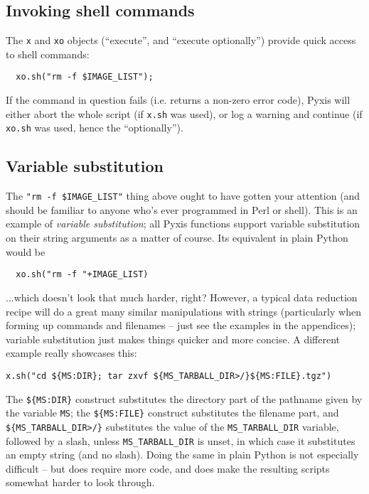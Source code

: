 \documentclass[a4paper,10pt]{article}
\begin{document}
\subsection{Invoking shell commands}

The {\tt x} and {\tt xo} objects (``execute'', and ``execute optionally'') provide quick access to shell 
commands:

\begin{verbatim}
  xo.sh("rm -f $IMAGE_LIST");
\end{verbatim}

If the command in question fails (i.e. returns a non-zero error code), Pyxis will either abort the whole script 
(if {\tt x.sh} was used), or log a warning and continue (if {\tt xo.sh} was used, hence the ``optionally'').

\subsection{Variable substitution}

The {\tt "rm -f \$IMAGE\_LIST"} thing above ought to have gotten your attention (and should be familiar to anyone who's 
ever programmed in Perl or shell). This is an example of {\em variable substitution}; all Pyxis functions support variable
substitution on their string arguments as a matter of course. Its equivalent in plain Python would be

\begin{verbatim}
  xo.sh("rm -f "+IMAGE_LIST)
\end{verbatim}

...which doesn't look that much harder, right? However, a typical data reduction recipe will do a great many similar
manipulations with strings (particularly when forming up commands and filenames -- just see the examples in the appendices);
variable substitution just makes things quicker and more concise. A different example really showcases this:

\begin{verbatim}
x.sh("cd ${MS:DIR}; tar zxvf ${MS_TARBALL_DIR>/}${MS:FILE}.tgz")
\end{verbatim}

The {\tt \$\{MS:DIR\}} construct substitutes the directory part of the pathname given by the variable {\tt MS}; the {\tt \$\{MS:FILE\}} construct substitutes the filename part, and {\tt \$\{MS\_TARBALL\_DIR>/\}} substitutes the value of the {\tt MS\_TARBALL\_DIR} variable, followed by a slash, unless {\tt MS\_TARBALL\_DIR} is unset, in which case it substitutes an empty string (and no slash). Doing the same in plain Python is not especially difficult -- but does require more code, and does make the resulting scripts
somewhat harder to look through.
\end{document}
